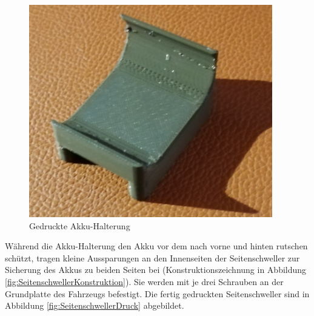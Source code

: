 \begin{minipage}[b]{0.45\textwidth}
\begin{figure}[H] %
\includegraphics[width=.85\textwidth]{sec2/images/3DAnbaukomponenten/Druckbilder/AkkuHalterungDruck} 
\centering
\captionsetup{width=.9\textwidth}
\caption[Gedruckte Akku-Halterung]{Gedruckte Akku-Halterung}\centering
\label{fig:AkkuHalterungDruck}
\end{figure}
\end{minipage}
\vspace{11mm}

Während die Akku-Halterung den Akku vor dem nach vorne und hinten rutschen schützt, tragen kleine Aussparungen an den Innenseiten der Seitenschweller zur Sicherung des Akkus zu beiden Seiten bei (Konstruktionszeichnung in Abbildung \ref{fig:SeitenschwellerKonstruktion}). Sie werden mit je drei Schrauben an der Grundplatte des Fahrzeugs befestigt. Die fertig gedruckten Seitenschweller sind in Abbildung \ref{fig:SeitenschwellerDruck} abgebildet.

